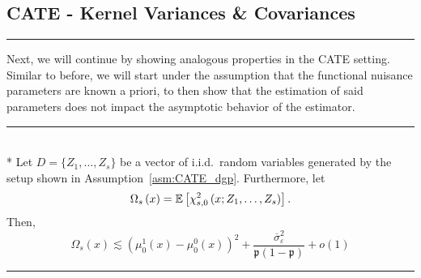 \subsection{CATE - Kernel Variances \& Covariances}
\hrule
Next, we will continue by showing analogous properties in the CATE setting.
Similar to before, we will start under the assumption that the functional nuisance parameters are known a priori, to then show that the estimation of said parameters does not impact the asymptotic behavior of the estimator.
\vspace{0.5cm}
\hrule

\begin{lem}\label{lem:CATE_omega_s}\mbox{}\\*
	Let $D = \{Z_1, \dotsc, Z_{s}\}$ be a vector of i.i.d.\ random variables generated by the setup shown in Assumption~\ref{asm:CATE_dgp}.
	Furthermore, let
	\begin{equation}
		\Omega_{s}\left(x\right)
		= \mathbb{E}\left[\chi_{s,0}^{2}\left(x; Z_1, \ldots,  Z_{s}\right)\right].
	\end{equation}
	Then,
	\begin{equation}
		\Omega_{s}\left(x\right)
		\lesssim \left(\mu_{0}^{1}\left(x\right) - \mu_{0}^{0}\left(x\right)\right)^2 + \frac{\overline{\sigma}^2_{\varepsilon}}{\mathfrak{p}\left(1 - \mathfrak{p}\right)} + o(1)
	\end{equation}
\end{lem}
\hrule
